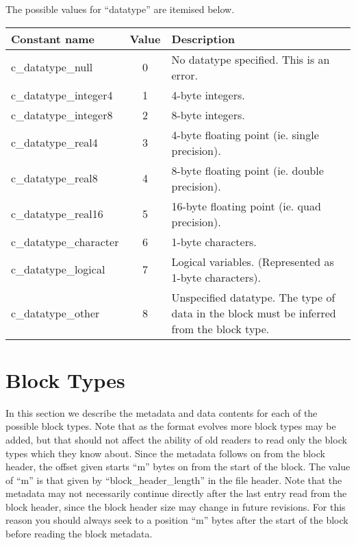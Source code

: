 \documentclass[12pt]{article}
\newcommand{\subsec}{\section}
\begin{document}
The possible values for ``datatype'' are itemised below.\\

\begin{center}
\begin{tabularx}{0.9\textwidth}[!hbt]{lcX}
  Constant name & Value & Description
  \\\toprule

  c\_datatype\_null & 0 & No datatype specified. This is an error.
  \\\midrule

  c\_datatype\_integer4 & 1 & 4-byte integers.
  \\\midrule

  c\_datatype\_integer8 & 2 & 8-byte integers.
  \\\midrule

  c\_datatype\_real4 & 3 & 4-byte floating point (ie. single precision).
  \\\midrule

  c\_datatype\_real8 & 4 & 8-byte floating point (ie. double precision).
  \\\midrule

  c\_datatype\_real16 & 5 & 16-byte floating point (ie. quad precision).
  \\\midrule

  c\_datatype\_character & 6 & 1-byte characters.
  \\\midrule

  c\_datatype\_logical & 7 & Logical variables. (Represented as 1-byte
  characters).
  \\\midrule

  c\_datatype\_other & 8 & Unspecified datatype. The type of data in the block
  must be inferred from the block type.
\end{tabularx}
\end{center}\vspace{10pt}

\subsec{Block Types}

In this section we describe the metadata and data contents for each of
the possible block types. Note that as the format evolves more block types
may be added, but that should not affect the ability of old readers to
read only the block types which they know about.
Since the metadata follows on from the block header, the offset given
starts ``m'' bytes on from the start of the block. The value of ``m''
is that given by ``block\_header\_length'' in the file header. Note that
the metadata may not necessarily continue directly after the last entry
read from the block header, since the block header size may change in
future revisions. For this reason you should always seek to a position
``m'' bytes after the start of the block before reading the block metadata.
\end{document}

